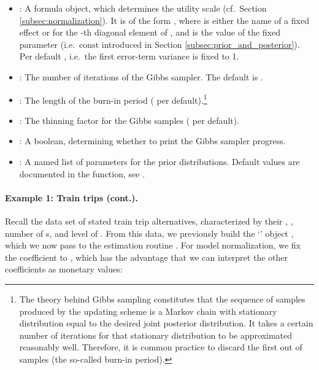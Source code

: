 \documentclass[article]{jss}
\newcommand{\class}[1]{`\code{#1}'}
\newcommand{\fct}[1]{\code{#1()}}
\begin{document}
\begin{itemize}
  \item {}: A formula object, which determines the utility scale (cf.\ Section \ref{subsec:normalization}). It is of the form , where  is either the name of a fixed effect or  for the -th diagonal element of , and  is the value of the fixed parameter (i.e.\ $\text{const}$ introduced in Section \ref{subsec:prior_and_posterior}). Per default , i.e.\ the first error-term variance is fixed to 1.
  \item {}: The number of iterations of the Gibbs sampler. The default is .
  \item {}: The length of the burn-in period ( per default).\footnote{The theory behind Gibbs sampling constitutes that the sequence of samples produced by the
updating scheme is a Markov chain with stationary distribution equal to the desired joint posterior distribution. It takes a certain number of iterations for that stationary distribution to be approximated reasonably well. Therefore, it is common practice to discard the first  out of  samples (the so-called burn-in period).}
  \item {}: The thinning factor for the Gibbs samples ( per default).
  \item {}: A boolean, determining whether to print the Gibbs sampler progress.
  \item {}: A named list of parameters for the prior distributions. Default values are documented in the \fct{check\_prior} function, see .
\end{itemize}

\paragraph{Example 1: Train trips (cont.).}

Recall the  data set of stated train trip alternatives, characterized by their , , number of s, and level of . From this data, we previously build the \class{RprobitB\_data} object , which we now pass to the estimation routine \fct{fit\_model}. For model normalization, we fix the  coefficient to , which has the advantage that we can interpret the other coefficients as monetary values:
\end{document}
